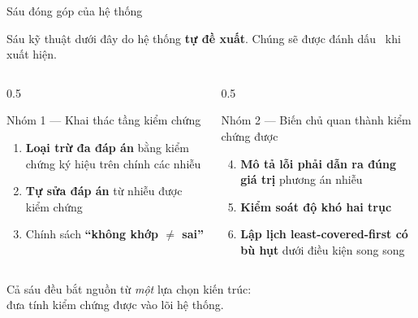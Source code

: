\documentclass[aspectratio=169,11pt]{beamer}
\newcommand{\punch}[1]{\begin{center}\alert{\large #1}\end{center}}
\newcommand{\dg}{\;\raisebox{0.15ex}{\colorbox{cAccent}{\color{white}\scriptsize\bfseries\,ĐÓNG GÓP\,}}}
\begin{document}
\begin{frame}{Sáu đóng góp của hệ thống}
  \vspace{0.2em}
  \begin{center}
    \small Sáu kỹ thuật dưới đây do hệ thống \textbf{tự đề xuất}. Chúng sẽ được đánh dấu \dg\ khi xuất hiện.
  \end{center}
  \vspace{0.4em}
  \begin{columns}[T]
    \begin{column}{0.5\textwidth}
      \begin{alertblock}{Nhóm 1 --- Khai thác tầng kiểm chứng}
        \small
        \begin{enumerate}
          \item \textbf{Loại trừ đa đáp án} bằng kiểm chứng ký hiệu trên chính các nhiễu
          \smallskip
          \item \textbf{Tự sửa đáp án} từ nhiễu được kiểm chứng
          \smallskip
          \item Chính sách \textbf{``không khớp $\neq$ sai''}
        \end{enumerate}
      \end{alertblock}
    \end{column}
    \begin{column}{0.5\textwidth}
      \begin{alertblock}{Nhóm 2 --- Biến chủ quan thành kiểm chứng được}
        \small
        \begin{enumerate}
          \setcounter{enumi}{3}
          \item \textbf{Mô tả lỗi phải dẫn ra đúng giá trị} phương án nhiễu
          \smallskip
          \item \textbf{Kiểm soát độ khó hai trục}
          \smallskip
          \item \textbf{Lập lịch least-covered-first có bù hụt} dưới điều kiện song song
        \end{enumerate}
      \end{alertblock}
    \end{column}
  \end{columns}
  \vfill
  \punch{Cả sáu đều bắt nguồn từ \emph{một} lựa chọn kiến trúc:\\[0.2em] đưa tính kiểm chứng được vào lõi hệ thống.}
  \vfill
\end{frame}
\end{document}

